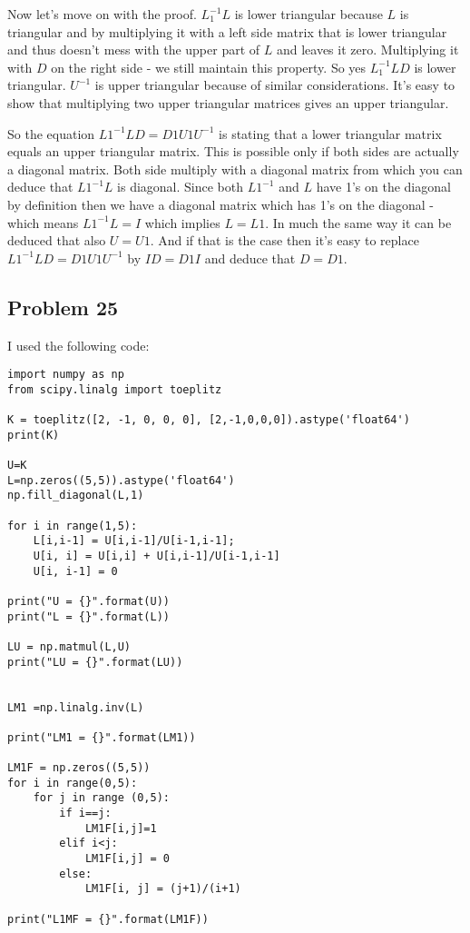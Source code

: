 \documentclass[a4paper,11pt]{article}
\begin{document}
Now let's move on with the proof.
$L_1^{-1}L$ is lower triangular because $L$ is triangular and by multiplying it with a left side matrix that is lower triangular and thus doesn't mess with the upper part of $L$ and leaves it zero. Multiplying it with $D$ on the right side - we still maintain this property. So yes $L_1^{-1}LD$ is lower triangular.
$U^{-1}$ is upper triangular because of similar considerations. It's easy to show that multiplying two upper triangular matrices gives an upper triangular.

So the equation $L1^{-1}LD=D1U1U^{-1}$ is stating that a lower triangular matrix equals an upper triangular matrix. This is possible only if both sides are actually a diagonal matrix. Both side multiply with a diagonal matrix from which you can deduce that $L1^{-1}L$ is diagonal. Since both $L1^{-1}$ and $L$  have 1's on the diagonal by definition then we have a diagonal matrix which has 1's on the diagonal - which means $L1^{-1}L=I$ which implies $L=L1$. In much the same way it can be deduced that also $U=U1$.
And if that is the case then it's easy to replace $L1^{-1}LD=D1U1U^{-1}$ by $ID=D1I$ and deduce that $D=D1$.

\subsection*{Problem 25}
I used the following code:
\lstset{language=Python}
\lstset{frame=lines}
\lstset{basicstyle=\footnotesize}
\begin{lstlisting}
import numpy as np
from scipy.linalg import toeplitz

K = toeplitz([2, -1, 0, 0, 0], [2,-1,0,0,0]).astype('float64')
print(K)

U=K
L=np.zeros((5,5)).astype('float64')
np.fill_diagonal(L,1)

for i in range(1,5):
    L[i,i-1] = U[i,i-1]/U[i-1,i-1];
    U[i, i] = U[i,i] + U[i,i-1]/U[i-1,i-1]
    U[i, i-1] = 0

print("U = {}".format(U))
print("L = {}".format(L))

LU = np.matmul(L,U)
print("LU = {}".format(LU))


LM1 =np.linalg.inv(L)

print("LM1 = {}".format(LM1))

LM1F = np.zeros((5,5))
for i in range(0,5):
    for j in range (0,5):
        if i==j:
            LM1F[i,j]=1
        elif i<j:
            LM1F[i,j] = 0
        else:
            LM1F[i, j] = (j+1)/(i+1)

print("L1MF = {}".format(LM1F))
\end{lstlisting}
\end{document}
